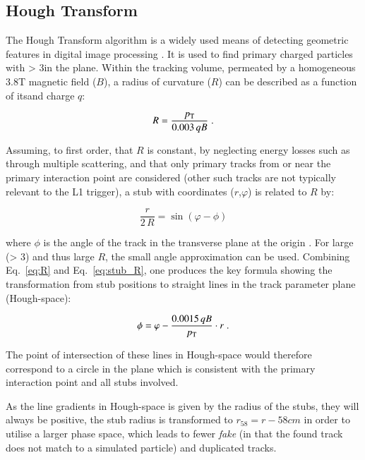 \subsection{Hough Transform}
The Hough Transform algorithm is a widely used means of detecting geometric features in digital image processing \cite{HT}. It is used to find primary charged particles with \pT > 3\GeV in the \rphi plane. Within the tracking volume, permeated by a homogeneous 3.8T magnetic field ($B$), a radius of curvature ($R$) can be described as a function of its\pT and charge $q$:

\begin{equation}
R = \frac{p_{\mathrm{T}}}{0.003\,qB} \;.
\label{eq:R}
\end{equation}

Assuming, to first order, that $R$ is constant, by neglecting energy losses such as through multiple scattering, and that only primary tracks from or near the primary interaction point are considered (other such tracks are not typically relevant to the L1 trigger), a stub with coordinates ($r$,$\varphi$) is related to $R$ by:

\begin{equation}
\frac r{2\,R} = \sin\left(\varphi-\phi\right)
\label{eq:stub_R}
\end{equation}

where $\phi$ is the angle of the track in the transverse plane at the origin \cite{markthesis}. For large \pT (> 3\GeV) and thus large $R$, the small angle approximation can be used. Combining Eq.~\ref{eq:R} and Eq.~\ref{eq:stub_R}, one produces the key formula showing the transformation from stub positions to straight lines in the track parameter plane (Hough-space):

\begin{equation}
\phi = \varphi - \frac{0.0015\,qB}{p_{\mathrm{T}}}\cdot r \;.
\label{eq:localHT}
\end{equation}

The point of intersection of these lines in Hough-space would therefore correspond to a circle in the \rphi plane which is consistent with the primary interaction point and all stubs involved.

As the line gradients in Hough-space is given by the radius of the stubs, they will always be positive, the stub radius is transformed to $r_{58} = r - 58cm$ in order to utilise a larger phase space, which leads to fewer \textit{fake} (in that the found track does not match to a simulated particle) and duplicated tracks.

